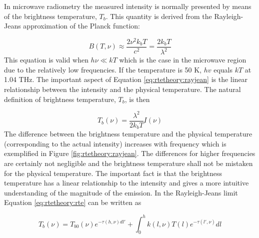  In microwave radiometry the measured intensity is normally presented
 by means of the brightness temperature, $T_b$. This quantity is
 derived from the Rayleigh-Jeans approximation of the Planck function:

 \begin{equation}
   B(T,\nu) \approx \frac{2\nu^2k_bT}{c^2} = \frac{2k_bT}{\lambda^2}
  \label{eq:rtetheory:rayjean}
 \end{equation}  
 This equation is valid when $h\nu \ll kT$ which is the case in the
 microwave region due to the relatively low frequencies. If the
 temperature is 50 K, $hv$ equals $kT$ at 1.04 THz. The important
 aspect of Equation \ref{eq:rtetheory:rayjean} is the linear relationship
 between the intensity and the physical temperature. The natural
 definition of brightness temperature, $T_b$, is then

 \begin{equation}
   T_b(\nu) = \frac{\lambda^2}{2k_bT} I(\nu)
  \label{eq:rtetheory:tb}
 \end{equation}  
 The difference between the brightness temperature and the physical
 temperature (corresponding to the actual intensity) increases with
 frequency which is exemplified in Figure \ref{fig:rtetheory:rayjean}. The
 differences for higher frequencies are certainly not negligible and
 the brightness temperature shall not be mistaken for the physical
 temperature. The important fact is that the brightness temperature
 has a linear relationship to the intensity and gives a more intuitive
 understanding of the magnitude of the emission. In the Rayleigh-Jeans
 limit Equation \ref{eq:rtetheory:rte} can be written as

 \begin{equation}
   T_b(\nu) = T_{b0}(\nu)e^{-\tau(h,\nu)dl'} + 
     \int^h_0{k(l,\nu)T(l) e^{-\tau(l',\nu)} dl}
  \label{eq:rtetheory:rte_tb}
 \end{equation}  

